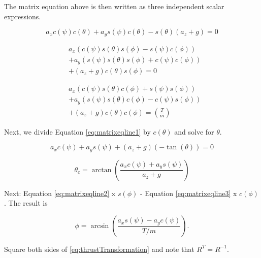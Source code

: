 The matrix equation above is then written as three independent scalar expressions.

\begin{equation}
    \label{eq:matrixeqline1}
    a_x c(\psi) c(\theta) + a_y s(\psi) c(\theta) - s(\theta)( a_z + g ) = 0
\end{equation}

\begin{equation}
    \label{eq:matrixeqline2}
    \begin{split}
    & a_x (c(\psi) s(\theta) s(\phi) - s(\psi) c(\phi))\\
    &+ a_y (s(\psi) s(\theta) s(\phi) + c(\psi) c(\phi))\\
    &+ ( a_z + g )c(\theta) s(\phi) = 0
\end{split}
\end{equation}

\begin{equation}
    \label{eq:matrixeqline3}
    \begin{split}
    & a_x (c(\psi) s(\theta) c(\phi) + s(\psi) s(\phi))\\
    &+ a_y (s(\psi) s(\theta) c(\phi) - c(\psi) s(\phi))\\
    &+ ( a_z + g )c(\theta) c(\phi) = \left(\frac{T}{m}\right)
\end{split}
\end{equation}


Next, we divide Equation \eqref{eq:matrixeqline1} by $c(\theta)$ and solve for $\theta$.

\begin{equation}
a_x c(\psi) + a_y s(\psi) + (a_z+g)(-\tan(\theta)) = 0
\end{equation}


\begin{equation}
    \label{eq:thetac}
    \theta_c = \arctan \left( \frac{a_x c(\psi) + a_y s(\psi)}{a_z+g} \right)
\end{equation}


Next: Equation \eqref{eq:matrixeqline2} x $ s(\phi) $ - Equation \eqref{eq:matrixeqline3} x $ c(\phi) $. The result is

\begin{equation}
    \label{eq:phiIntermediate}
    \phi = \arcsin \left( \frac{a_x s(\psi) - a_y c(\psi)}{T/m} \right).
\end{equation}

Square both sides of \eqref{eq:thrustTransformation} and note that $ R^T = R^{-1}$.

